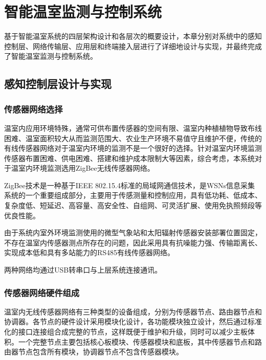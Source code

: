 

\chapter{智能温室监测与控制系统}
\label{chapter:IntelligentGreenhouseSystem}
基于智能温室系统的四层架构设计和各层次的概要设计，本章分别对系统中的感知控制层、网络传输层、应用层和终端接入层进行了详细地设计与实现，并最终完成了智能温室监测与控制系统。

\section{感知控制层设计与实现}
	\subsection{传感器网络选择}
	温室内应用环境特殊，通常可供布置传感器的空间有限、温室内种植植物导致布线困难、温室面积较大从而监测范围大、农业生产环境不易值守且维护不便，传统的有线传感器网络对于温室内环境的监测不是一个很好的选择。针对温室内环境监测传感器布置困难、供电困难、搭建和维护成本限制大等因素，综合考虑，本系统对于温室内环境监测选用ZigBee无线传感器网络。

	ZigBee技术是一种基于IEEE 802.15.4标准的局域网通信技术，是WSNs信息采集系统的一个重要组成部分，主要用于传感测量和控制应用，具有低功耗、低成本、复杂度低、短延迟、高容量、高安全性、自组网、可灵活扩展、使用免执照频段等优良性能。

	由于系统内室外环境监测使用的微型气象站和太阳辐射传感器安装部署位置固定，不存在温室内传感器测点所存在的问题，因此采用具有抗噪能力强、传输距离长、实现成本低和具有多站能力的RS485有线传感器网络。

	两种网络均通过USB转串口与上层系统连接通讯。
	\subsection{传感器网络硬件组成}
	温室内无线传感器网络有三种类型的设备组成，分别为传感器节点、路由器节点和协调器。各节点的硬件设计采用模块化设计，各功能模块独立设计，然后通过标准化的接口连接组合成完整的节点，这样既便于维护和升级，同时可以减少主板体积。一个完整节点主要包括核心板模块、传感器模块和底板，其中传感器节点和路由器节点包含所有模块，协调器节点不包含传感器模块。
